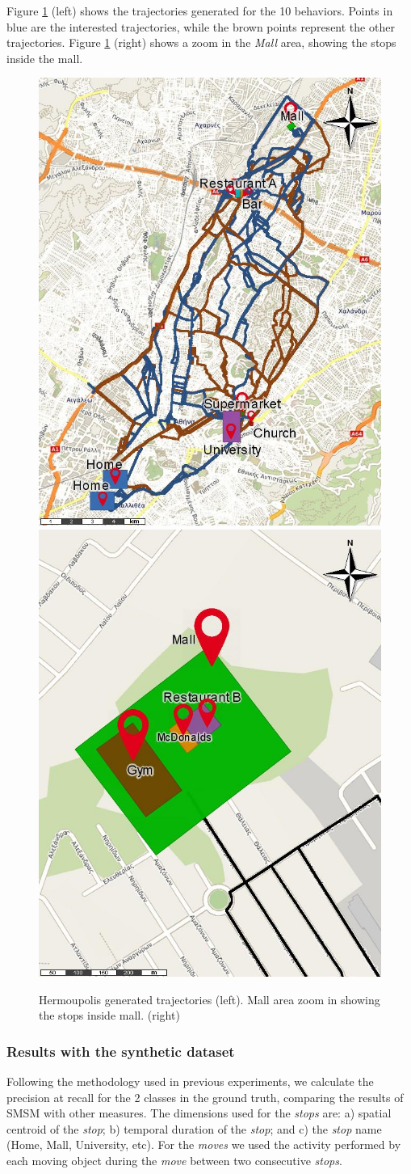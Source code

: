 \documentclass[12pt]{article}
\begin{document}
Figure \ref{fig:hermoupolis_groundtruth} (left) shows the trajectories generated for the 10 behaviors. Points in blue are the interested trajectories, while the brown points represent the other trajectories.
Figure \ref{fig:hermoupolis_groundtruth} (right) shows a zoom in the \emph{Mall} area, showing the stops inside the mall.

\begin{figure}[ht!]
\centerline{
\centering
\includegraphics[width=.4\textwidth]{Images/Hermoupolis-RawPoints.jpg}
\includegraphics[width=.4\textwidth]{Images/Hermoupolis-CommercialCenter.jpg}
}
\caption{Hermoupolis generated trajectories (left). Mall area zoom in showing the stops inside mall. (right)}
\label{fig:hermoupolis_groundtruth}
\end{figure}

\subsubsection{Results with the synthetic dataset}
Following the methodology used in previous experiments, we calculate the precision at recall for the 2 classes in the ground truth, comparing the results of SMSM with other measures. The dimensions used for the \emph{stops} are: a) spatial centroid of the \emph{stop}; b) temporal duration of the \emph{stop}; and c) the \emph{stop} name (Home, Mall, University, etc). For the \emph{moves} we used the activity performed by each moving object during the \emph{move} between two consecutive \emph{stops}.
\end{document}
